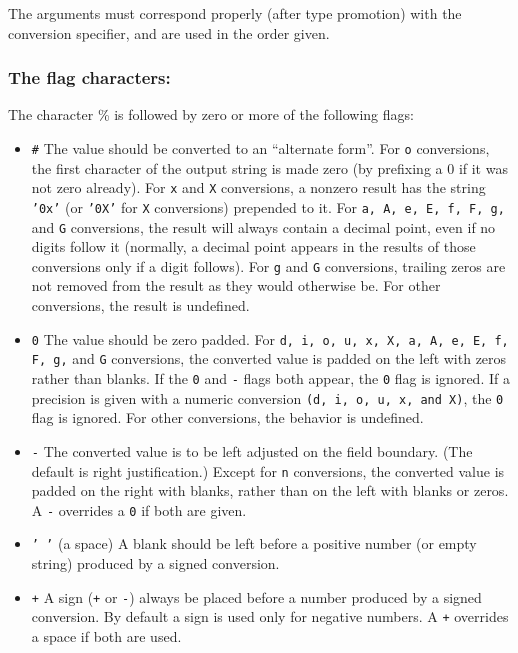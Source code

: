 The  arguments must correspond properly (after type promotion) with the
conversion specifier, and are used in the order given.

\subsubsection{The flag characters:}

The character \% is followed by zero or more of the following flags:
\begin{itemize}
  \item \texttt{\#}   The  value  should be converted to an ``alternate form''.  For \texttt{o} conversions, the first character of the output  string  is  made  zero (by prefixing a $0$ if it was not zero already).  For \texttt{x} and \texttt{X} conversions, a nonzero result has the string \texttt{'0x'} (or \texttt{'0X'} for  \texttt{X}  conversions) prepended to it.  For \texttt{a, A, e, E, f, F, g,} and \texttt{G}  conversions, the result will always  contain  a  decimal  point,  even  if  no digits follow it (normally, a decimal point appears  in the results of those conversions only if  a  digit  follows).  For \texttt{g} and \texttt{G} conversions, trailing zeros are not removed from the  result as they would otherwise be.  For other  conversions,  the  result is undefined.
  \item \texttt{0}   The value should be zero padded.  For \texttt{d, i, o, u, x, X, a, A, e, E, f, F, g,} and \texttt{G} conversions, the converted value is padded  on the  left  with  zeros rather than blanks.  If the \texttt{0} and \texttt{-} flags  both appear, the \texttt{0} flag is ignored.  If  a  precision  is  given  with  a numeric conversion \texttt{(d, i, o, u, x, and X)}, the \texttt{0} flag is  ignored.  For other conversions, the behavior is undefined.
  \item \texttt{-}   The converted value is to be left adjusted on the  field  boundary.  (The default is right justification.) Except for \texttt{n} conversions, the converted value is padded on the right  with  blanks, rather than on the left with blanks or zeros.  A \texttt{-} overrides a \texttt{0} if both are given.
  \item \texttt{' '} (a space) A blank should be left before a  positive  number  (or empty string) produced by a signed conversion.
  \item \texttt{+} A  sign  (\texttt{+} or \texttt{-}) always be placed before a number produced by a signed conversion.  By default a sign is used only for  negative numbers. A \texttt{+} overrides a space if both are used.
\end{itemize}

